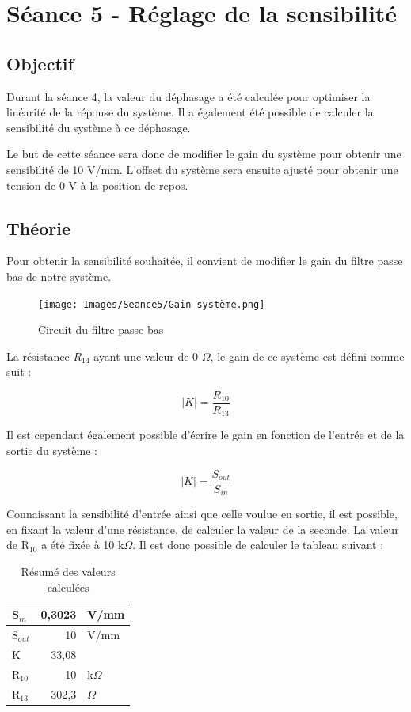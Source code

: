 \section{Séance 5 - Réglage de la sensibilité}
\subsection{Objectif}
Durant la séance 4, la valeur du déphasage a été calculée pour optimiser la linéarité
de la réponse du système. Il a également été possible de calculer la sensibilité du système
à ce déphasage.
\vspace{0.2cm}

Le but de cette séance sera donc de modifier le gain du système pour obtenir une sensibilité de
10 V/mm. L'offset du système sera ensuite ajusté pour obtenir une tension de 0 V à la position
de repos.
\vspace{0.2cm}

\subsection{Théorie}
Pour obtenir la sensibilité souhaitée, il convient de modifier le gain du filtre passe bas
de notre système.

\begin{figure}[H]
    \centering
    \texttt{[image: Images/Seance5/Gain système.png]}
    \caption{Circuit du filtre passe bas}
    \label{fig:FPB}
\end{figure}

La résistance $R_{14}$ ayant une valeur de 0 $\Omega$, le gain de ce système est défini comme suit :

\begin{equation*}
     |K| = \frac{R_{10}}{R_{13}}
\end{equation*}

Il est cependant également possible d'écrire le gain en fonction de l'entrée et de la sortie du
système :

\begin{equation*}
    |K| = \frac{S_{out}}{S_{in}}
\end{equation*}

Connaissant la sensibilité d'entrée ainsi que celle voulue en sortie, il est possible, en fixant
la valeur d'une résistance, de calculer la valeur de la seconde. La valeur de R$_{10}$ a été fixée
à 10 k$\Omega$. Il est donc possible de calculer le tableau suivant :


\begin{table}[H]
    \centering
    \begin{tabular}{|l|rl|}
    \cline{1-3}
    S$_{in}$  & 0,3023    & V/mm    \\ \hline
    S$_{out}$ & 10         & V/mm    \\ \hline
    K    & 33,08 &  \\ \hline
    R$_{10}$  & 10      & k$\Omega$     \\ \hline
    R$_{13}$  & 302,3     & $\Omega$     \\ \hline
    \end{tabular}
    \caption{Résumé des valeurs calculées}
    \label{tab:ResumeValeurs}
    \end{table}

